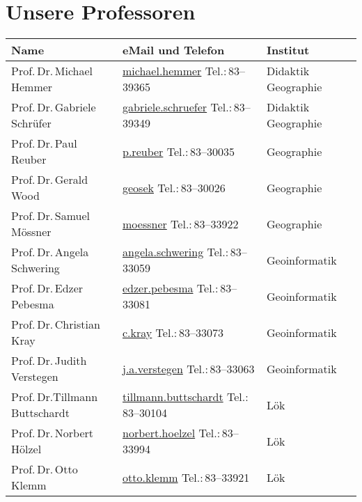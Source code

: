 \newpage

\section{Unsere Professoren}
\begin{small}
\begin{longtable}{p{} p{} p{}}
  Name & eMail und Telefon & Institut\\ \hline \hline
  Prof.\,Dr.\,Michael Hemmer & \url{michael.hemmer} \newline Tel.:\,83--39365 & Didaktik Geographie\\
  Prof.\,Dr.\,Gabriele Schrüfer & \url{gabriele.schruefer} \newline Tel.:\,83--39349 & Didaktik Geographie\\  \hline
  Prof.\,Dr.\,Paul Reuber & \url{p.reuber} \newline Tel.:\,83--30035 & Geographie\\
  Prof.\,Dr.\,Gerald Wood & \url{geosek} \newline Tel.:\,83--30026 & Geographie\\
  Prof.\,Dr.\,Samuel Mössner & \url{moessner} \newline Tel.:\,83--33922 & Geographie\\\hline
  Prof.\,Dr.\,Angela Schwering & \url{angela.schwering} \newline Tel.:\,83--33059 & Geoinformatik\\
  Prof.\,Dr.\,Edzer Pebesma & \url{edzer.pebesma} \newline Tel.:\,83--33081 & Geoinformatik\\ 
  Prof.\,Dr.\,Christian Kray & \url{c.kray} \newline Tel.:\,83--33073 &  Geoinformatik \\  
  Prof.\,Dr.\,Judith Verstegen & \url{j.a.verstegen} \newline Tel.:\,83--33063 &  Geoinformatik \\ \hline
  Prof.\,Dr.\newline Tillmann Buttschardt & \url{tillmann.buttschardt} \newline Tel.:\,83--30104 & Lök\\
  Prof.\,Dr.\,Norbert Hölzel & \url{norbert.hoelzel} \newline Tel.:\,83--33994 & Lök\\
  Prof.\,Dr.\,Otto Klemm & \url{otto.klemm} \newline Tel.:\,83--33921 & Lök\\

\end{longtable}
\end{small}
